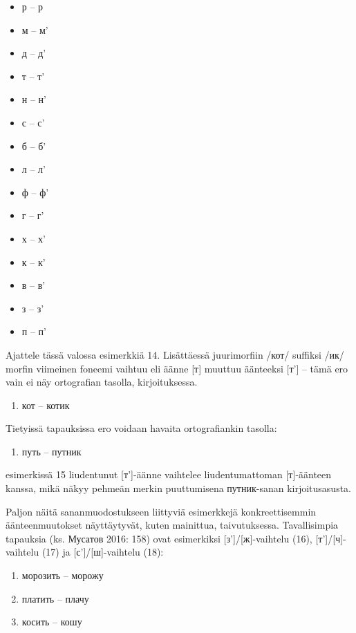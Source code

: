 \documentclass[]{scrartcl}
\begin{document}
\begin{itemize}
\itemsep1pt\parskip0pt
\item
  р -- р
\item
  м -- м'
\item
  д -- д'
\item
  т -- т'
\item
  н -- н'
\item
  с -- с'
\item
  б -- б'
\item
  л -- л'
\item
  ф -- ф'
\item
  г -- г'
\item
  х -- х'
\item
  к -- к'
\item
  в -- в'
\item
  з -- з'
\item
  п -- п'
\end{itemize}

Ajattele tässä valossa esimerkkiä 14. Lisättäessä juurimorfiin /кот/
suffiksi /ик/ morfin viimeinen foneemi vaihtuu eli äänne {[}т{]} muuttuu
äänteeksi {[}т'{]} -- tämä ero vain ei näy ortografian tasolla,
kirjoituksessa.

\begin{enumerate}
\def\labelenumi{(\arabic{enumi})}
\setcounter{enumi}{13}
\itemsep1pt\parskip0pt
\item
  кот -- котик
\end{enumerate}

Tietyissä tapauksissa ero voidaan havaita ortografiankin tasolla:

\begin{enumerate}
\def\labelenumi{(\arabic{enumi})}
\setcounter{enumi}{14}
\itemsep1pt\parskip0pt
\item
  путь -- путник
\end{enumerate}

esimerkissä 15 liudentunut {[}т'{]}-äänne vaihtelee liudentumattoman
{[}т{]}-äänteen kanssa, mikä näkyy pehmeän merkin puuttumisena
путник-sanan kirjoitusasusta.

Paljon näitä sananmuodostukseen liittyviä esimerkkejä konkreettisemmin
äänteenmuutokset näyttäytyvät, kuten mainittua, taivutuksessa.
Tavallisimpia tapauksia (ks. Мусатов 2016: 158) ovat esimerkiksi
{[}з'{]}/{[}ж{]}-vaihtelu (16), {[}т'{]}/{[}ч{]}-vaihtelu (17) ja
{[}с'{]}/{[}ш{]}-vaihtelu (18):

\begin{enumerate}
\def\labelenumi{(\arabic{enumi})}
\setcounter{enumi}{15}
\itemsep1pt\parskip0pt
\item
  морозить -- морожу
\item
  платить -- плачу
\item
  косить -- кошу
\end{enumerate}
\end{document}
